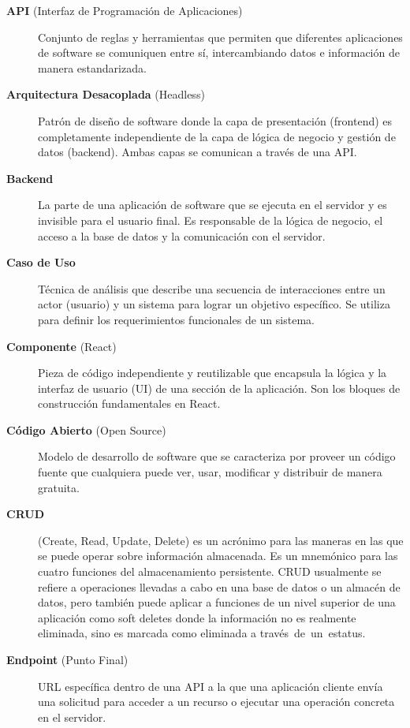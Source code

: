 \documentclass[12pt,letterpaper,spanish]{report}
\begin{document}
\begin{description}

  \item[\textbf{API} (Interfaz de Programación de Aplicaciones)] Conjunto de reglas y herramientas que permiten que diferentes aplicaciones de software se comuniquen entre sí, intercambiando datos e información de manera estandarizada.

  \item[\textbf{Arquitectura Desacoplada} (Headless)] Patrón de diseño de software donde la capa de presentación (frontend) es completamente independiente de la capa de lógica de negocio y gestión de datos (backend). Ambas capas se comunican a través de una API.

  \item[\textbf{Backend}] La parte de una aplicación de software que se ejecuta en el servidor y es invisible para el usuario final. Es responsable de la lógica de negocio, el acceso a la base de datos y la comunicación con el servidor.

  \item[\textbf{Caso de Uso}] Técnica de análisis que describe una secuencia de interacciones entre un actor (usuario) y un sistema para lograr un objetivo específico. Se utiliza para definir los requerimientos funcionales de un sistema.

  \item[\textbf{Componente} (React)] Pieza de código independiente y reutilizable que encapsula la lógica y la interfaz de usuario (UI) de una sección de la aplicación. Son los bloques de construcción fundamentales en React.

  \item[\textbf{Código Abierto} (Open Source)] Modelo de desarrollo de software que se caracteriza por proveer un código fuente que cualquiera puede ver, usar, modificar y distribuir de manera gratuita.
      
  \item[\textbf{CRUD}](Create, Read, Update, Delete) es un acrónimo para las maneras en las que se puede operar sobre información almacenada. Es un mnemónico para las cuatro funciones del almacenamiento persistente. CRUD usualmente se refiere a operaciones llevadas a cabo en una base de datos o un almacén de datos, pero también puede aplicar a funciones de un nivel superior de una aplicación como soft deletes donde la información no es realmente eliminada, sino es marcada como eliminada a través de un estatus.
      
  \item[\textbf{Endpoint} (Punto Final)] URL específica dentro de una API a la que una aplicación cliente envía una solicitud para acceder a un recurso o ejecutar una operación concreta en el servidor.
    

\end{description}
\end{document}
